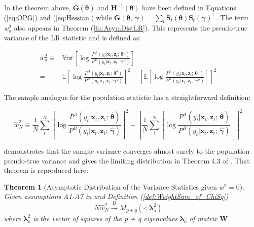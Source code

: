 \documentclass[12pt]{article}
\newcommand{\HI}[1]{\boldsymbol{H}^{-1}(#1)}
\theoremstyle{definition}
\newtheorem{theorem}{Theorem}[section]
\begin{document}
In the theorem above, $\boldsymbol{G}(\boldsymbol{\theta})$ and $\HI{\boldsymbol{\theta}}$
have been defined in Equations (\ref{eq:OPG}) and (\ref{eq:Hessian}) while 
$\boldsymbol{G}(\boldsymbol{\theta}, \, \boldsymbol{\gamma}) = \sum_{t} \boldsymbol{S}_{t}(\boldsymbol{\theta}) \boldsymbol{S}_{t}(\boldsymbol{\gamma})^\top$.
The term $w^{2}_{o}$ also appears in Theorem (\ref{th:AsymDistLR}). This represents
the pseudo-true variance of the LR statistic and is defined as:

\begin{align*}
  w_{o}^{2} \equiv & \mathbb{Var} \left[ \log \frac{ P^{A}(y_{t} | \boldsymbol{x}_{t}, \boldsymbol{z}_{t}; \, \boldsymbol{\theta}^{o}) }{ P^{B}(y_{t} | \boldsymbol{x}_{t}, \boldsymbol{z}_{t}; \, \boldsymbol{\gamma}^{o}) } \right] \\
   = & \mathbb{E} \left[ \log \frac{ P^{A}(y_{t} | \boldsymbol{x}_{t}, \boldsymbol{z}_{t}; \, \boldsymbol{\theta}^{o}) }{ P^{B}(y_{t} | \boldsymbol{x}_{t}, \boldsymbol{z}_{t}; \, \boldsymbol{\gamma}^{o}) } \right]^{2} - \left[ \mathbb{E} \left[ \log \frac{ P^{A}(y_{t} | \boldsymbol{x}_{t}, \boldsymbol{z}_{t}; \, \boldsymbol{\theta}^{o}) }{ P^{B}(y_{t} | \boldsymbol{x}_{t}, \boldsymbol{z}_{t}; \, \boldsymbol{\gamma}^{o}) } \right] \right]^{2}
\end{align*}

The sample analogue for the population statistic has a straightforward definition:

\begin{equation}
  \hat{w}^{2}_{N} \equiv \frac{1}{N} \sum_{t}^{N} \left[ \log \frac{ P^{A}(y_{t} | \boldsymbol{x}_{t}, \boldsymbol{z}_{t}; \, \hat{\boldsymbol{\theta}}) }{ P^{B}(y_{t} | \boldsymbol{x}_{t}, \boldsymbol{z}_{t}; \, \hat{\boldsymbol{\gamma}}) } \right]^{2} - \left[ \frac{1}{N} \sum_{t}^{N} \left[ \log \frac{ P^{A}(y_{t} | \boldsymbol{x}_{t}, \boldsymbol{z}_{t}; \, \hat{\boldsymbol{\theta}}) }{ P^{B}(y_{t} | \boldsymbol{x}_{t}, \boldsymbol{z}_{t}; \, \hat{\boldsymbol{\gamma}}) } \right] \right]^{2}
\end{equation}

\citet{Voung1989} demonstrates that the sample variance converges almost surely
to the population pseudo-true variance and gives the limiting distribution in
Theorem 4.3 of \citet{Voung1989}. That theorem is reproduced here:

\begin{theorem}[Asymptotic Distribution of the Variance Statistics given $w^{2} = 0$] \label{th:AsymDistVar_at_null}
  \emph{Given assumptions A1-A7 in \citet{Voung1989} and Definition (\ref{def:WeightSum_of_ChiSq})
  \begin{equation}
    N \hat{w}^{2}_{N} \overset{D}{\longrightarrow} M_{p+q}(\cdot; \, \boldsymbol{\lambda}^{2}_{o})
  \end{equation}
  where $\boldsymbol{\lambda}^{2}_{o}$ is the vector of squares of the p + q eigenvalues $\boldsymbol{\lambda}_{o}$ of matrix $\boldsymbol{W}$.}
\end{theorem}
\end{document}
